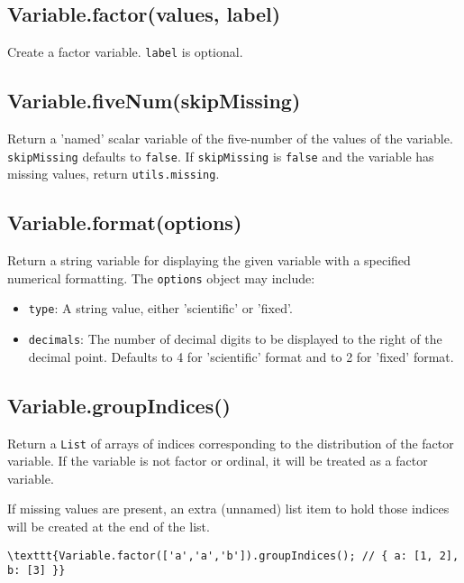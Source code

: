 \documentclass{article}
\begin{document}
    \subsection{Variable.factor(values, label)}
    Create a factor variable. \texttt{label} is optional.


    \subsection{Variable.fiveNum(skipMissing)}
    Return a 'named' scalar variable of the five-number of the values of the variable.
\texttt{skipMissing} defaults to \texttt{false}.  If \texttt{skipMissing} is \texttt{false} and
the variable has missing values, return \texttt{utils.missing}.


    \subsection{Variable.format(options)}
    Return a string variable for displaying the given variable with a
specified numerical formatting. The \texttt{options} object may include:


\begin{itemize}

\item \texttt{type}: A string value, either 'scientific' or 'fixed'.

\item \texttt{decimals}: The number of decimal digits to be displayed to the right of
the decimal point. Defaults to 4 for 'scientific' format and to 2 for 'fixed'
format.

\end{itemize}

    \subsection{Variable.groupIndices()}
    Return a \texttt{List} of arrays of indices corresponding to the distribution
of the factor variable. If the variable is not factor or ordinal, it will
be treated as a factor variable.


If missing values are present, an extra (unnamed) list item to hold those
indices will be created at the end of the list.


\begin{lstlisting}
\texttt{Variable.factor(['a','a','b']).groupIndices(); // { a: [1, 2], b: [3] }}\end{lstlisting}
\end{document}
